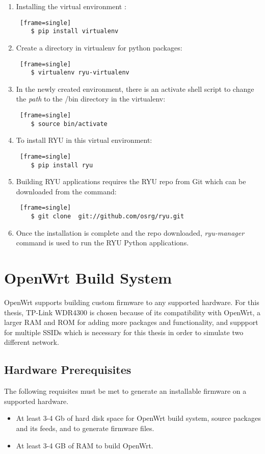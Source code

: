 \begin{enumerate}
	\item Installing the virtual environment :
	\begin{lstlisting} [frame=single]
	$ pip install virtualenv
	\end{lstlisting} 
	\item Create a directory in virtualenv for python packages: 
	\begin{lstlisting} [frame=single]
	$ virtualenv ryu-virtualenv
	\end{lstlisting}
	\item In the newly created environment, there is an activate shell script to change the \textit{path} to the /bin directory in the virtualenv: 
	\begin{lstlisting} [frame=single]
	$ source bin/activate
	\end{lstlisting}
	\item To install RYU in this virtual environment:
	\begin{lstlisting} [frame=single]
	$ pip install ryu
	\end{lstlisting}
	\item Building RYU applications requires the RYU repo from Git which can be downloaded from the command:
	\begin{lstlisting} [frame=single]
	$ git clone  git://github.com/osrg/ryu.git
	\end{lstlisting}
	\item Once the installation is complete and the repo downloaded, \textit{ryu-manager} command is used to run the RYU Python applications.
\end{enumerate}

\section{OpenWrt Build System \cite{OpenWrt_build_root}} \label{OpenWrt_build}
OpenWrt supports building custom firmware to any supported hardware. For this thesis, TP-Link WDR4300 is chosen because of its compatibility with OpenWrt, a larger RAM and ROM for adding more packages and functionality, and suppport for multiple SSIDs which is necessary for this thesis in order to simulate two different network.
\subsection{Hardware Prerequisites}
The following requisites must be met to generate an installable firmware on a supported hardware.
\begin{itemize}
	\item At least 3-4 Gb of hard disk space for OpenWrt build system, source packages and its feeds, and to generate firmware files.
	\item At least 3-4 GB of RAM to build OpenWrt.
\end{itemize}
